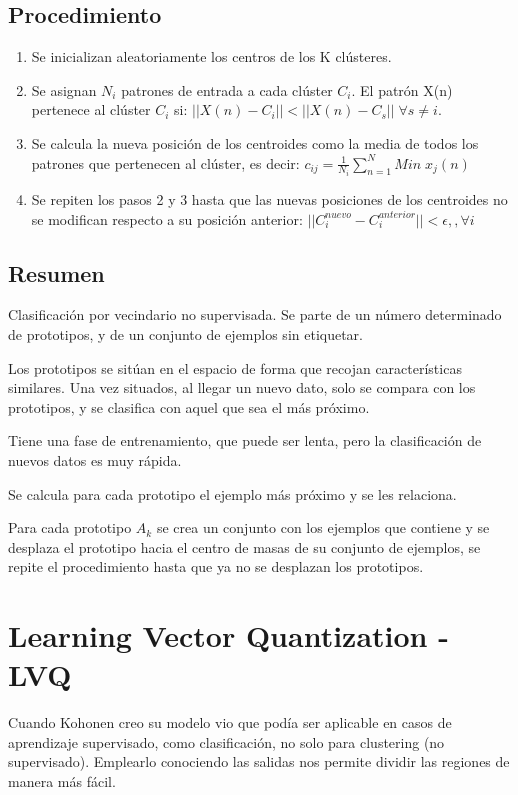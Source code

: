 \documentclass[12pt, twoside, openright]{report} %
\begin{document}
\subsection{Procedimiento}
\begin{enumerate}
	\item Se inicializan aleatoriamente los centros de los K clústeres.
	\item Se asignan $N_i$ patrones de entrada a cada clúster $C_i$. El patrón X(n) pertenece al clúster $C_i$ si: $||X(n) - C_i|| < || X(n) - C_s || \; \forall s \neq i$.
	\item Se calcula la nueva posición de los centroides como la media de todos los patrones que pertenecen al clúster, es decir: $c_{ij} = \frac{1}{N_i} \sum^N_{n=1} Min \; x_j(n)$
	\item Se repiten los pasos 2 y 3 hasta que las nuevas posiciones de los centroides no se modifican respecto a su posición anterior: $||C_i^{nuevo} - C_i^{anterior}|| < \epsilon ,, \forall i$
	\end{enumerate}
	
\subsection{Resumen}
Clasificación por vecindario no supervisada. Se parte de un número determinado de prototipos, y de un conjunto de ejemplos sin etiquetar.

Los prototipos se sitúan en el espacio de forma que recojan características similares. Una vez situados, al llegar un nuevo dato, solo se compara con los prototipos, y se clasifica con aquel que sea el más próximo.

Tiene una fase de entrenamiento, que puede ser lenta, pero la clasificación de nuevos datos es muy rápida.

Se calcula para cada prototipo el ejemplo más próximo y se les relaciona.

Para cada prototipo $A_k$ se crea un conjunto con los ejemplos que contiene y se desplaza el prototipo hacia el centro de masas de su conjunto de ejemplos, se repite el procedimiento hasta que ya no se desplazan los prototipos.

\section{Learning Vector Quantization - LVQ}
Cuando Kohonen creo su modelo vio que podía ser aplicable en casos de aprendizaje supervisado, como clasificación, no solo para clustering (no supervisado). Emplearlo conociendo las salidas nos permite dividir las regiones de manera más fácil.
\end{document}
